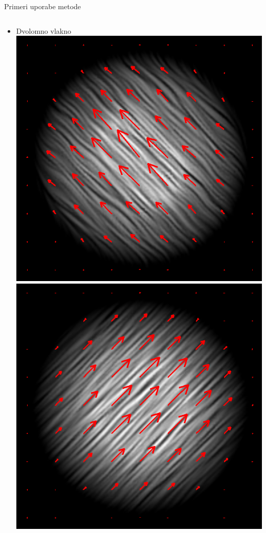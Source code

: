 \documentclass{beamer}
\begin{document}
\begin{frame}{Primeri uporabe metode}
\begin{columns}[c]
\begin{column}[T]{.5\textwidth}
\begin{itemize}
 \item Dvolomno vlakno
  \includegraphics[width=.41\textwidth]{./Slike/licp_0_68} \hspace{2pt}
  \includegraphics[width=.41\textwidth]{./Slike/licp_0_78}
\end{itemize}

\end{column}

\end{columns}

\end{frame}
\end{document}
